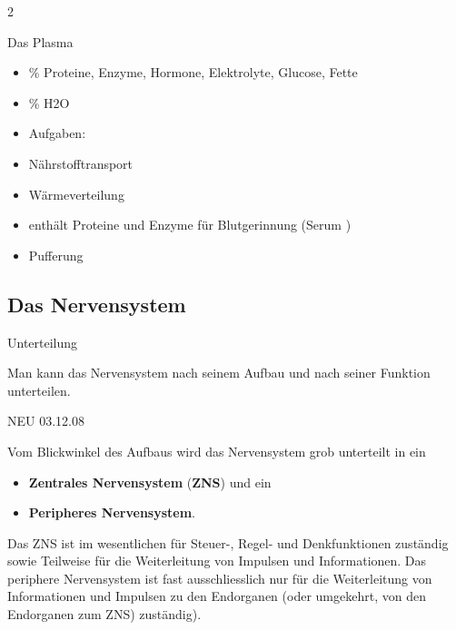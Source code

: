 \documentclass{article}
\newcommand\gEs[1]{\textbf{\textcolor[rgb]{0.0,0.0,0.5019608}{#1}}}
\newcommand\gEs[1]{\textbf{\textcolor[rgb]{0.0,0.0,0.5019608}{#1}}}
\newcommand\gT[1]{\textbf{\textup{\textcolor[rgb]{0.0,0.5019608,0.0}{#1}}}}
\newcommand\gNw[1]{#1}
\begin{document}
\begin{multicols}{2}
\begin{itemize}
\end{itemize}
{\mdseries\color{black}
Das Plasma}

\begin{itemize}
\item {\% Proteine, Enzyme, Hormone, Elektrolyte, Glucose, Fette}

\item {\% H2O}

\item {\mdseries
Aufgaben:}

\end{itemize}
\begin{itemize}
\item {\mdseries
N\"ahrstofftransport}

\item {\mdseries
W\"armeverteilung}

\end{itemize}
\begin{itemize}
\item {\mdseries
enth\"alt Proteine und Enzyme f\"ur  Blutgerinnung (Serum )}

\item {\mdseries
Pufferung}

\end{itemize}
\end{multicols}
\subsection{Das Nervensystem}
{\mdseries\color{black}
Unterteilung}

{\mdseries
Man kann das Nervensystem nach seinem Aufbau und nach seiner Funktion
unterteilen.}

\begin{center}
\begin{minipage}{4.001cm}
{\mdseries
\gNw{NEU }\gNw{03.12.08}}

\end{minipage}
\end{center}
{\mdseries
Vom Blickwinkel des Aufbaus wird das Nervensystem grob unterteilt in ein
}

\begin{itemize}
\item {\mdseries
\gEs{Zentrales Nervensystem}
(\gT{ZNS}) und ein }

\item {\mdseries
\gEs{Peripheres Nervensystem}.}

\end{itemize}
{\mdseries
Das ZNS ist im wesentlichen f\"ur Steuer-, Regel- und Denkfunktionen
zust\"andig sowie Teilweise f\"ur die Weiterleitung von Impulsen und
Informationen. Das periphere Nervensystem ist fast ausschliesslich nur
f\"ur die Weiterleitung von Informationen und Impulsen zu den
Endorganen (oder umgekehrt, von den Endorganen zum ZNS) zust\"andig). }
\end{document}
